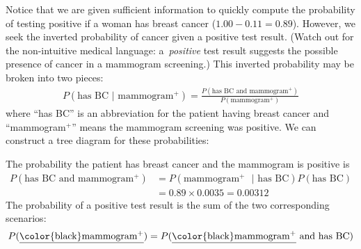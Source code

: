 \begin{examplewrap}
\begin{nexample}
Notice that we are given sufficient information to quickly compute the probability of testing positive if a woman has breast cancer ($1.00-0.11=0.89$). However, we seek the inverted probability of cancer given a positive test result. (Watch out for the non-intuitive medical language: a~\emph{positive} test result suggests the possible presence of cancer in a mammogram screening.) This inverted probability may be broken into two pieces:
\begin{align*}
P(\text{has BC } | \text{ mammogram$^+$}) = \frac{P(\text{has BC and mammogram$^+$})}{P(\text{mammogram$^+$})}
\end{align*}
where ``has BC'' is an abbreviation for the patient having
breast cancer and ``mammogram$^+$'' means the mammogram screening
was positive.
We can construct a tree diagram for these probabilities:
\begin{center}
\end{center}
The probability the patient has breast cancer
and the mammogram is positive is
\begin{align*}
P(\text{has BC and mammogram$^+$}) &= P(\text{mammogram$^+$ } | \text{ has BC})P(\text{has BC}) \\
	&= 0.89\times 0.0035 = 0.00312
\end{align*}
The probability of a positive test result is the sum of the two corresponding scenarios:
\begin{align*}
P(\text{\underline{\color{black}mammogram$^+$}})
  &= P(\text{\underline{\color{black}mammogram$^+$} and has BC}) \\

\end{align*}
\end{nexample}
\end{examplewrap}
